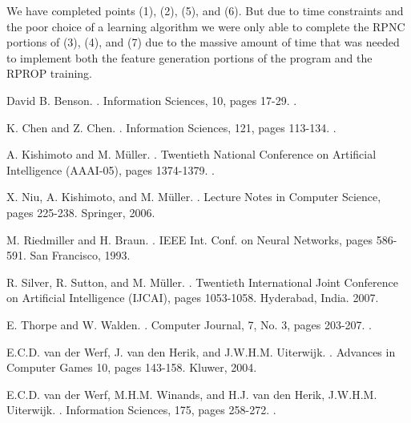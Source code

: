 \documentclass[11pt,letterpaper]{article}
\begin{document}
We have completed points (1), (2), (5), and (6). But due to time constraints and the poor choice of a learning
algorithm we were only able to complete the RPNC portions of (3), (4), and (7) due to the massive amount of time
that was needed to implement both the feature generation portions of the program and the RPROP training.

\begin{thebibliography}{}

David B. Benson.
.
\newblock Information Sciences, 10, pages 17-29.
.

K. Chen and Z. Chen.
.
\newblock Information Sciences, 121, pages 113-134.
.

A. Kishimoto and M. M\"uller.
.
\newblock Twentieth National Conference on Artificial Intelligence (AAAI-05), pages 1374-1379.
.

X. Niu, A. Kishimoto, and M. M\"uller.
.
\newblock Lecture Notes in Computer Science, pages 225-238.
\newblock Springer, 2006.

M. Riedmiller and H. Braun.
.
\newblock IEEE Int. Conf. on Neural Networks, pages 586-591.
\newblock San Francisco, 1993.

R. Silver, R. Sutton, and M. M\"uller.
.
\newblock Twentieth International Joint Conference on Artificial Intelligence (IJCAI), pages 1053-1058.
\newblock Hyderabad, India. 2007.

E. Thorpe and W. Walden.
.
\newblock Computer Journal, 7, No. 3, pages 203-207.
.

E.C.D. van der Werf, J. van den Herik, and J.W.H.M. Uiterwijk.
.
\newblock Advances in Computer Games 10, pages 143-158.
\newblock Kluwer, 2004.

E.C.D. van der Werf, M.H.M. Winands, and H.J. van den Herik, J.W.H.M. Uiterwijk.
.
\newblock Information Sciences, 175, pages 258-272.
.

\end{thebibliography}
\end{document}
